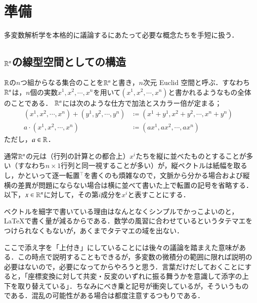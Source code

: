\section{準備}

多変数解析学を本格的に議論するにあたって必要な概念たちを手短に扱う．

\subsection{$\mathbb{R}^n$の線型空間としての構造}

\begin{defi}
$\mathbb{R}$の$n$つ組からなる集合のことを$\mathbb{R}^n$と書き，$n$次元 Euclid 空間と呼ぶ．すなわち$\mathbb{R}^n$は，$n$個の実数$x^1, x^2, \cdots, x^n$を用いて$(x^1, x^2, \cdots, x^n)$と書かれるようなもの全体のことである．
$\mathbb{R}^n$には次のような仕方で加法とスカラー倍が定まる；
\begin{align}
(x^1, x^2, \cdots, x^n)+(y^1, y^2, \cdots, y^n) &\coloneqq (x^1 + y^1, x^2 + y^2, \cdots, x^n + y^n) \\
a \cdot (x^1, x^2, \cdots, x^n) &\coloneqq (ax^1, ax^2, \cdots, ax^n) 
\end{align}ただし，$a \in \mathbb{R}$．
\end{defi}

通常$\mathbb{R}^n$の元は（行列の計算との都合上）$x^i$たちを縦に並べたものとすることが多い（すなわち$n \times 1$行列と同一視することが多い）が，縦ベクトルは紙幅を取るし，かといって逐一転置${}^\top$を書くのも煩雑なので，文脈から分かる場合および縦横の差異が問題にならない場合は横に並べて書いた上で転置の記号を省略する．以下，$x \in \mathbb{R}^n$に対して，その第$i$成分を$x^i$と表すことにする．

\begin{dig}
ベクトルを細字で書いている理由はなんとなくシンプルでかっこよいのと， \LaTeX で書く量が減るからである．数学の風習に合わせているというタテマエをつけられなくもないが，あくまでタテマエの域を出ない．
\end{dig}

\begin{dig}
ここで添え字を「上付き」にしていることには後々の議論を踏まえた意味がある．この時点で説明することもできるが，多変数の微積分の範囲に限れば説明の必要はないので，必要になってからやろうと思う．言葉だけだしておくことにすると，「座標変換に対して共変・反変のいずれに振る舞うかを意識して添字の上下を取り替えている」．ちなみにべき乗と記号が衝突しているが，そういうものである．混乱の可能性がある場合は都度注意するつもりである．
\end{dig}



